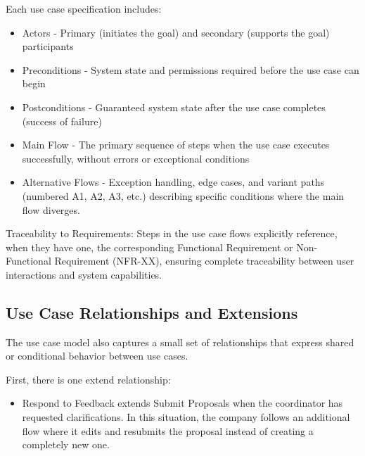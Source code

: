         {
            Each use case specification includes:
        }
        \begin{itemize}
            \item {Actors - Primary (initiates the goal) and secondary (supports the goal) participants}
            \item {Preconditions - System state and permissions required before the use case can begin}
            \item {Postconditions - Guaranteed system state after the use case completes (success of failure)}
            \item {Main Flow - The primary sequence of steps when the use case executes successfully, without errors or exceptional conditions}
            \item {Alternative Flows - Exception handling, edge cases, and variant paths 
                (numbered A1, A2, A3, etc.) describing specific conditions where the main flow diverges.
            }
        \end{itemize}
        {
            Traceability to Requirements: Steps in the use case flows explicitly reference, when they have one, the corresponding Functional Requirement or Non-Functional Requirement (NFR-XX), 
            ensuring complete traceability between user interactions and system capabilities.
        }

    \subsection{Use Case Relationships and Extensions}
        {
            The use case model also captures a small set of relationships that express shared or conditional behavior between use cases.
        }

        {
            First, there is one extend relationship:
        }
            \begin{itemize}
                \item {
                    Respond to Feedback extends Submit Proposals when the coordinator has requested clarifications. In this situation, the company follows an additional flow
                    where it edits and resubmits the proposal instead of creating a completely new one.
                }
            \end{itemize}
        
